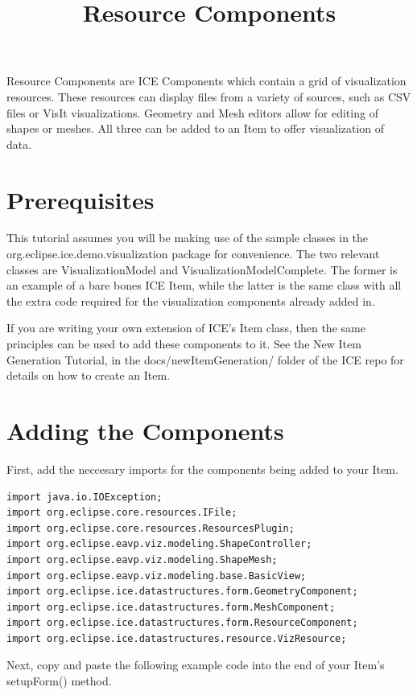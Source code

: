 \documentclass{article}
\begin{document}
\title{Resource Components}

Resource Components are ICE Components which contain a grid of visualization
resources. These resources can display files from a variety of sources,
such as CSV files or VisIt visualizations. Geometry and Mesh editors allow for
editing of shapes or meshes. All three can be added to an Item to offer
visualization of data.

\section{Prerequisites}

This tutorial assumes you will be making use of the sample classes in the
org.eclipse.ice.demo.visualization package for convenience. The two relevant
classes are VisualizationModel and VisualizationModelComplete. The former is an
example of a bare bones ICE Item, while the latter is the same class with all
the extra code required for the visualization components already added in.

If you are writing your own extension of ICE's Item class, then the same
principles can be used to add these components to it. See the New Item
Generation Tutorial, in the docs/newItemGeneration/ folder of the ICE repo for
details on how to create an Item.

\section{Adding the Components}

First, add the neccesary imports for the components being added to your Item. 

\begin{verbatim}
import java.io.IOException;
import org.eclipse.core.resources.IFile;
import org.eclipse.core.resources.ResourcesPlugin;
import org.eclipse.eavp.viz.modeling.ShapeController;
import org.eclipse.eavp.viz.modeling.ShapeMesh;
import org.eclipse.eavp.viz.modeling.base.BasicView;
import org.eclipse.ice.datastructures.form.GeometryComponent;
import org.eclipse.ice.datastructures.form.MeshComponent;
import org.eclipse.ice.datastructures.form.ResourceComponent;
import org.eclipse.ice.datastructures.resource.VizResource;
\end{verbatim}

Next, copy and paste the following example code into the end of your Item's
setupForm() method.
\end{document}
